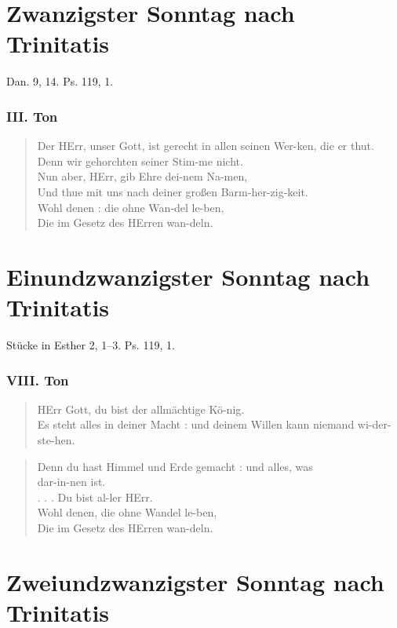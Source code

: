 \section{Zwanzigster Sonntag nach Trinitatis}

Dan. 9, 14. Ps. 119, 1.

\subsubsection{III. Ton}
\begin{verse}
Der HErr, unser Gott, ist gerecht in allen seinen Wer-ken, die er thut.\\
Denn wir gehorchten seiner Stim-me nicht.\\
Nun aber, HErr, gib Ehre dei-nem Na-men,\\
Und thue mit uns nach deiner großen Barm-her-zig-keit.\\
Wohl denen : die ohne Wan-del le-ben,\\
Die im Gesetz des HErren wan-deln.
\end{verse}

\section[Einundzwanzigster Sonntag]{Einundzwanzigster Sonntag nach Trinitatis}

Stücke in Esther 2, 1–3. Ps. 119, 1.

\subsubsection{VIII. Ton}
\begin{verse}
HErr Gott, du bist der allmächtige Kö-nig.\\
Es steht alles in deiner Macht : und deinem Willen kann niemand wi-der-ste-hen.
\end{verse}

\begin{verse}
Denn du hast Himmel und Erde gemacht : und alles, was\\
dar-in-nen ist.\\
. . . Du bist al-ler HErr.\\
Wohl denen, die ohne Wandel le-ben,\\
Die im Gesetz des HErren wan-deln.
\end{verse}

\section[Zweiundzwanzigster Sonntag]{Zweiundzwanzigster Sonntag nach Trinitatis}


